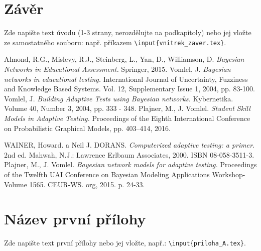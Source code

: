 \documentclass[a4paper,twoside,12pt]{book}
\begin{document}



\chapter*{Závěr} %
%
Zde napište text úvodu (1-3 strany, nerozdělujte na podkapitoly) nebo jej vložte ze samostatného souboru: např. příkazem \texttt{\textbackslash input\{vnitrek\_zaver.tex\}}.
%
%


\clearpage  %

\begin{thebibliography}{99}
	 Almond, R.G., Mislevy, R.J., Steinberg, L., Yan, D., Williamson, D. \textit{Bayesian Networks in Educational Assessment.} Springer, 2015.
	 Vomlel, J. \textit{Bayesian networks in educational testing.} International Journal of Uncertainty, Fuzziness and Knowledge Based Systems. Vol. 12, Supplementary Issue 1, 2004, pp. 83-100.
   Vomlel, J. \textit{Building Adaptive Tests using Bayesian networks.} Kybernetika. Volume 40, Number 3, 2004, pp. 333 - 348.
	 Plajner, M., J. Vomlel. \textit{Student Skill Models in Adaptive Testing.} Proceedings of the Eighth International Conference on Probabilistic Graphical Models, pp. 403–414, 2016.

	 WAINER, Howard. a Neil J. DORANS. \textit{Computerized adaptive testing: a primer}. 2nd ed. Mahwah, N.J.: Lawrence Erlbaum Associates, 2000. ISBN 08-058-3511-3.
	 Plajner, M., J. Vomlel. \textit{Bayesian network models for adaptive testing.} Proceedings of the Twelfth UAI Conference on Bayesian Modeling Applications Workshop-Volume 1565. CEUR-WS. org, 2015. p. 24-33.
\end{thebibliography}


\newpage %
\appendix %



\chapter{Název první přílohy}
%
Zde napište text první přílohy nebo jej vložte, např.: \texttt{\textbackslash input\{priloha\_A.tex\}}.
%
\end{document}

